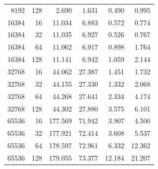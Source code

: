 \documentclass[11pt]{article}
\begin{document}
\begin{table}[H]
\begin{tabular}{rrrrrr}
8192 & 128 & 2.690 & 1.631 & 0.490 & 0.995 \\
16384 & 16 & 11.034 & 6.883 & 0.572 & 0.774 \\
16384 & 32 & 11.035 & 6.927 & 0.526 & 0.767 \\
16384 & 64 & 11.062 & 6.917 & 0.898 & 1.764 \\
16384 & 128 & 11.141 & 6.942 & 1.059 & 2.144 \\
32768 & 16 & 44.062 & 27.387 & 1.451 & 1.732 \\
32768 & 32 & 44.155 & 27.330 & 1.332 & 2.068 \\
32768 & 64 & 44.268 & 27.641 & 2.334 & 4.174 \\
32768 & 128 & 44.302 & 27.880 & 3.575 & 6.101 \\
65536 & 16 & 177.569 & 71.942 & 3.907 & 4.500 \\
65536 & 32 & 177.921 & 72.414 & 3.608 & 5.537 \\
65536 & 64 & 178.597 & 72.961 & 6.332 & 12.362 \\
65536 & 128 & 179.055 & 73.377 & 12.184 & 21.207 \\
\bottomrule
\end{tabular}
\end{table}
\end{document}
